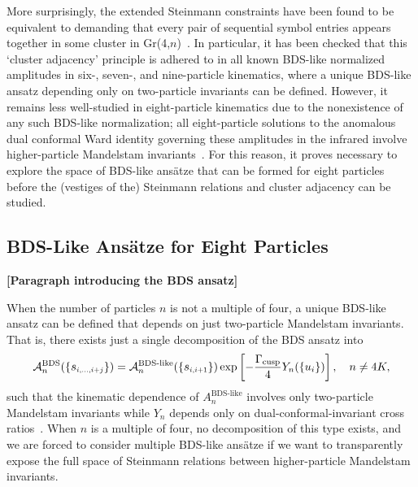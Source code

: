 \documentclass[11pt]{article}
\def\draftnote#1{{\bf [#1]}}
\def\mand#1{\scaleto{s}{4.6pt}_{\scaleto{#1}{5.2pt}}}
\begin{document}
More surprisingly, the extended Steinmann constraints have been found to be equivalent to demanding that every pair of sequential symbol entries appears together in some cluster in Gr(4,$n$)~\cite{Drummond:2017ssj}. In particular, it has been checked that this `cluster adjacency' principle is adhered to in all known BDS-like normalized amplitudes in six-, seven-, and nine-particle kinematics, where a unique BDS-like ansatz depending only on two-particle invariants can be defined. However, it remains less well-studied in eight-particle kinematics due to the nonexistence of any such BDS-like normalization; all eight-particle solutions to the anomalous dual conformal Ward identity governing these amplitudes in the infrared involve higher-particle Mandelstam invariants~\cite{Drummond:2007au}. For this reason, it proves necessary to explore the space of BDS-like ans\"atze that can be formed for eight particles before the (vestiges of the) Steinmann relations and cluster adjacency can be studied.

\subsection{BDS-Like Ans\"atze for Eight Particles}

\draftnote{Paragraph introducing the BDS ansatz}

When the number of particles $n$ is not a multiple of four, a unique BDS-like ansatz can be defined that depends on just two-particle Mandelstam invariants. That is, there exists just a single decomposition of the BDS ansatz into
\begin{equation}
{\cal A}_n^{\text{BDS}}(\{\mand{i,\dots,i+j}\}) = {\cal A}_n^{\text{BDS-like}}(\{\mand{i,i+1}\}) \exp \left[ - \frac{\Gamma_{\text{cusp}}}{4} Y_{n}(\{u_i\})  \right], \quad n\neq4K,
\end{equation}
such that the kinematic dependence of $A^{\text{BDS-like}}_{n}$ involves only two-particle Mandelstam invariants while $Y_{n}$ depends only on dual-conformal-invariant cross ratios~\cite{Yang:2010az}. %
When $n$ is a multiple of four, no decomposition of this type exists, and we are forced to consider multiple BDS-like ans\"atze if we want to transparently expose the full space of Steinmann relations between higher-particle Mandelstam invariants. 
\end{document}
